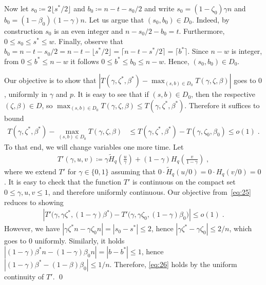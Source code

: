 \documentclass{article}
\newcommand{\Htilde}{\tilde{H}}
\theoremstyle{plain}
\theoremstyle{plain}
\theoremstyle{plain}
\theoremstyle{plain}
\theoremstyle{plain}
\theoremstyle{plain}
\theoremstyle{plain}
\theoremstyle{plain}
\theoremstyle{plain}
\theoremstyle{plain}
\theoremstyle{remark}
\theoremstyle{remark}
\theoremstyle{remark}
\theoremstyle{plain}
\begin{document}
  Now let $s_0\coloneqq 2\lfloor s^*/2 \rfloor$
  and $b_0\coloneqq n-t-s_0/2$ and write
  $s_0=(1-\zeta_0)\gamma n$ and $b_0=(1-\beta_0)(1-\gamma)n$.
  Let us argue that $(s_0,b_0)\in D_0$. Indeed, by construction 
  $s_0$ is an even integer and $n-s_0/2-b_0=t$.
  Furthermore, $0\le s_0\le s^*\le w$. Finally, observe that
  $b_0=n-t-s_0/2=n-t-\lfloor s^*/2\rfloor=\lceil n-t-s^*/2\rceil
  =\lceil b^*\rceil$.
  Since $n-w$ is integer, from $0\le b^*\le n-w$ it follows
  $0\le b^* \le b_0\le n-w$. Hence, $(s_0,b_0)\in D_0$.

  Our objective is to show that
  $|T(\gamma,\zeta^*,\beta^*)-
  \max_{(s,b)\in D_0} T(\gamma,\zeta,\beta)|$ goes to $0$,
  uniformly in $\gamma$ and $p$. It is easy to see that
  if $(s,b)\in D_0$, then the respective $(\zeta,\beta)\in D$,
  so $\max_{(s,b)\in D_0} T(\gamma,\zeta,\beta)\le T(\gamma,\zeta^*,\beta^*)$. Therefore it suffices to bound
  \begin{align}
  \label{eq:25}
  T(\gamma,\zeta^*,\beta^*)-\max_{(s,b)\in D_0} T(\gamma,\zeta,\beta)
  &\le T(\gamma,\zeta^*,\beta^*)-T(\gamma,\zeta_0,\beta_0)
  \le o(1)\;.
  \end{align}
  To that end, we will change variables one more time. Let
  \begin{align*}
  T'(\gamma,u,v)\coloneqq \gamma \Htilde_q\left(\frac{u}{\gamma}\right)
  +(1-\gamma)H_q\left(\frac{v}{1-\gamma}\right)\;,
  \end{align*}
  where we extend $T'$ for $\gamma\in\{0,1\}$ assuming that
  $0\cdot \Htilde_q(u/0)=0\cdot H_q(v/0)=0$. It is easy
  to check that the function $T'$ is continuous on the compact set
  $0\le \gamma,u,v\le 1$, and therefore uniformly continuous.
  Our objective from~\eqref{eq:25} reduces to showing
  \begin{align}
  \label{eq:26}
  \left| T'\big(\gamma,\gamma\zeta^*,(1-\gamma)\beta^*\big)
  -T'\big(\gamma,\gamma\zeta_0,(1-\gamma)\beta_0\big)\right|\le o(1)\;.
  \end{align}
  However, we have $|\gamma \zeta^*n-\gamma \zeta_0 n|=|s_0-s^*|\le 2$,
  hence $|\gamma \zeta^*-\gamma \zeta_0|\le 2/n$, which goes to
  0 uniformly. Similarly, it holds
  $|(1-\gamma)\beta^* n-(1-\gamma)\beta_0 n|=|b-b^*|\le 1$,
  hence $|(1-\gamma)\beta^*-(1-\beta)\beta_0|\le 1/n$.
  Therefore, \eqref{eq:26} holds by the uniform continuity of $T'$.
\qed
\end{document}
